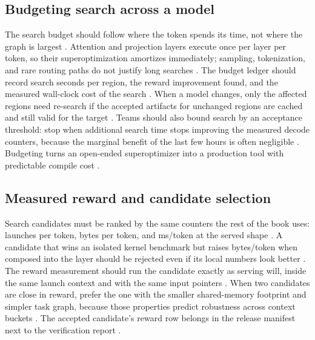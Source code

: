 \subsection{Budgeting search across a model}

The search budget should follow where the token spends its time, not where the graph is largest \citep{wu2024mirage,kwon2023vllm}. Attention and projection layers execute once per layer per token, so their superoptimization amortizes immediately; sampling, tokenization, and rare routing paths do not justify long searches \citep{taxbreak2026,memoryfloor2026}. The budget ledger should record search seconds per region, the reward improvement found, and the measured wall-clock cost of the search \citep{wu2024mirage,patel2025llminference}. When a model changes, only the affected regions need re-search if the accepted artifacts for unchanged regions are cached and still valid for the target \citep{chen2020compilerbasedhardw,wu2024mirage}. Teams should also bound search by an acceptance threshold: stop when additional search time stops improving the measured decode counters, because the marginal benefit of the last few hours is often negligible \citep{wu2024mirage,taxbreak2026}. Budgeting turns an open-ended superoptimizer into a production tool with predictable compile cost \citep{memoryfloor2026,patel2025llminference}.

\subsection{Measured reward and candidate selection}

Search candidates must be ranked by the same counters the rest of the book uses: launches per token, bytes per token, and ms/token at the served shape \citep{memoryfloor2026,taxbreak2026,patel2025llminference}. A candidate that wins an isolated kernel benchmark but raises bytes/token when composed into the layer should be rejected even if its local numbers look better \citep{wu2024mirage,memoryfloor2026}. The reward measurement should run the candidate exactly as serving will, inside the same launch context and with the same input pointers \citep{patel2025llminference,mpk2025}. When two candidates are close in reward, prefer the one with the smaller shared-memory footprint and simpler task graph, because those properties predict robustness across context buckets \citep{wu2024mirage,memoryfloor2026}. The accepted candidate's reward row belongs in the release manifest next to the verification report \citep{chen2020compilerbasedhardw,taxbreak2026}.


